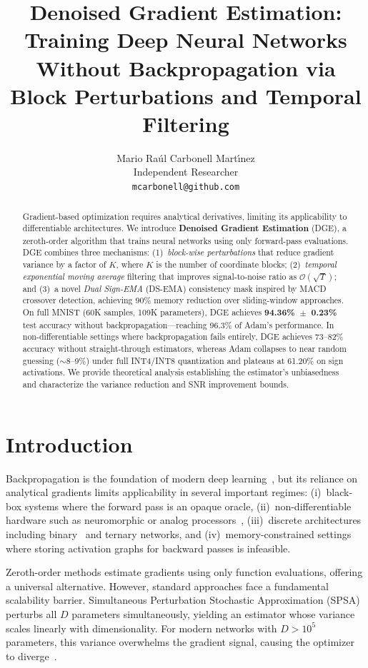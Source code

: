 \documentclass[10pt]{article}
\title{Denoised Gradient Estimation: \\ Training Deep Neural Networks Without Backpropagation via Block Perturbations and Temporal Filtering}
\author{
  Mario Ra\'ul Carbonell Mart\'{\i}nez \\
  Independent Researcher \\
  \texttt{mcarbonell@github.com} \\
}
\begin{document}
\maketitle

\begin{abstract}
Gradient-based optimization requires analytical derivatives, limiting its applicability to differentiable architectures. We introduce \textbf{Denoised Gradient Estimation} (DGE), a zeroth-order algorithm that trains neural networks using only forward-pass evaluations. DGE combines three mechanisms: (1)~\emph{block-wise perturbations} that reduce gradient variance by a factor of $K$, where $K$ is the number of coordinate blocks; (2)~\emph{temporal exponential moving average} filtering that improves signal-to-noise ratio as $\mathcal{O}(\sqrt{T})$; and (3)~a novel \emph{Dual Sign-EMA} (DS-EMA) consistency mask inspired by MACD crossover detection, achieving 90\% memory reduction over sliding-window approaches. On full MNIST (60K samples, 109K parameters), DGE achieves \textbf{94.36\%~$\pm$~0.23\%} test accuracy without backpropagation---reaching 96.3\% of Adam's performance. In non-differentiable settings where backpropagation fails entirely, DGE achieves 73--82\% accuracy without straight-through estimators, whereas Adam collapses to near random guessing ($\sim$8--9\%) under full INT4/INT8 quantization and plateaus at 61.20\% on sign activations. We provide theoretical analysis establishing the estimator's unbiasedness and characterize the variance reduction and SNR improvement bounds.
\end{abstract}

\section{Introduction}
\label{sec:intro}

Backpropagation is the foundation of modern deep learning~\citep{rumelhart1986learning,lecun2015deep}, but its reliance on analytical gradients limits applicability in several important regimes: (i)~black-box systems where the forward pass is an opaque oracle, (ii)~non-differentiable hardware such as neuromorphic or analog processors~\citep{schuman2022opportunities,davies2018loihi}, (iii)~discrete architectures including binary~\citep{yin2020binary} and ternary networks, and (iv)~memory-constrained settings where storing activation graphs for backward passes is infeasible.

Zeroth-order methods estimate gradients using only function evaluations, offering a universal alternative. However, standard approaches face a fundamental scalability barrier. Simultaneous Perturbation Stochastic Approximation (SPSA)~\citep{spall1992multivariate} perturbs all $D$ parameters simultaneously, yielding an estimator whose variance scales linearly with dimensionality. For modern networks with $D > 10^5$ parameters, this variance overwhelms the gradient signal, causing the optimizer to diverge~\citep{ghadimi2013optimal}.
\end{document}
